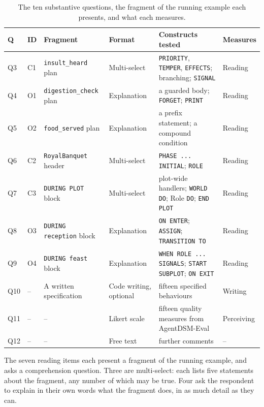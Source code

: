 \begin{table}[htpb]
\centering
\small
\begin{tabular}{|l|l|p{3.0cm}|p{2.2cm}|p{4.6cm}|l|}
\hline
\textbf{Q} & \textbf{ID} & \textbf{Fragment} & \textbf{Format} & \textbf{Constructs tested} & \textbf{Measures} \\
\hline
Q3  & C1 & \lstinline|insult_heard| plan  & Multi-select & \lstinline|PRIORITY|, \lstinline|TEMPER|, \lstinline|EFFECTS|; branching; \lstinline|SIGNAL| & Reading \\
Q4  & O1 & \lstinline|digestion_check| plan & Explanation & a guarded body; \lstinline|FORGET|; \lstinline|PRINT| & Reading \\
Q5  & O2 & \lstinline|food_served| plan   & Explanation & a prefix statement; a compound condition & Reading \\
Q6  & C2 & \lstinline|RoyalBanquet| header & Multi-select & \lstinline|PHASE ... INITIAL|; \lstinline|ROLE| & Reading \\
Q7  & C3 & \lstinline|DURING PLOT| block  & Multi-select & plot-wide handlers; \lstinline|WORLD DO|; Role \lstinline|DO|; \lstinline|END PLOT| & Reading \\
Q8  & O3 & \lstinline|DURING reception| block & Explanation & \lstinline|ON ENTER|; \lstinline|ASSIGN|; \lstinline|TRANSITION TO| & Reading \\
Q9  & O4 & \lstinline|DURING feast| block & Explanation & \lstinline|WHEN ROLE ... SIGNALS|; \lstinline|START SUBPLOT|; \lstinline|ON EXIT| & Reading \\
Q10 & -- & A written specification & Code writing, optional & fifteen specified behaviours & Writing \\
Q11 & -- & -- & Likert scale & fifteen quality measures from AgentDSM-Eval & Perceiving \\
Q12 & -- & -- & Free text & further comments & -- \\
\hline
\end{tabular}
\caption{The ten substantive questions, the fragment of the running example each presents, and what each measures.}
\label{tab:q-instrument}
\end{table}
 
The seven reading items each present a fragment of the running example, and asks a comprehension question. Three are multi-select: each lists five statements about the fragment, any number of which may be true. Four ask the respondent to explain in their own words what the fragment does, in as much detail as they can.
 
